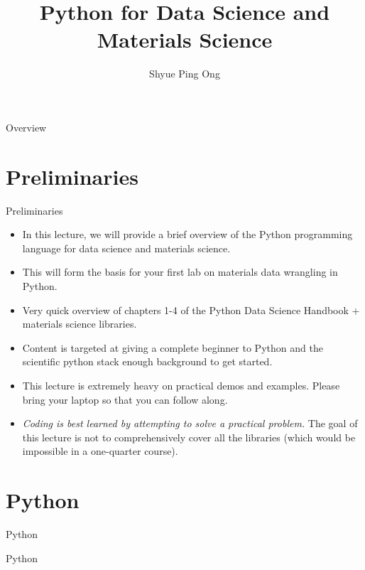 \documentclass[aspectratio=169]{beamer}
\title[Python for Data Science and Materials Science]{Python for Data Science and Materials Science}
\author{Shyue Ping Ong}
\institute[UCSD]{University of California, San Diego\\
\medskip
}
\date{\classyear} %
\begin{document}
    \begin{frame}
        \titlepage %
    \end{frame}


    \begin{frame}{Overview}
        \tableofcontents
    \end{frame}


    \section{Preliminaries}

    \begin{frame}{Preliminaries}
        \begin{itemize}
            \item In this lecture, we will provide a brief overview of the Python programming language for data science and materials science.
            \item This will form the basis for your first lab on materials data wrangling in Python.
            \item Very quick overview of chapters 1-4 of the Python Data Science Handbook\cite{vanderplasPythonDataScience2016} + materials science libraries.
            \item Content is targeted at giving a complete beginner to Python and the scientific python stack enough background to get started.
            \item This lecture is extremely heavy on practical demos and examples. Please bring your laptop so that you can follow along.
            \item \textit{Coding is best learned by attempting to solve a practical problem.} The goal of this lecture is not to comprehensively cover all the libraries (which would be impossible in a one-quarter course).
        \end{itemize}
    \end{frame}


    \section{Python}

    \begin{frame}{Python}
        \Huge{\centerline{Python}}
    \end{frame}
\end{document}
